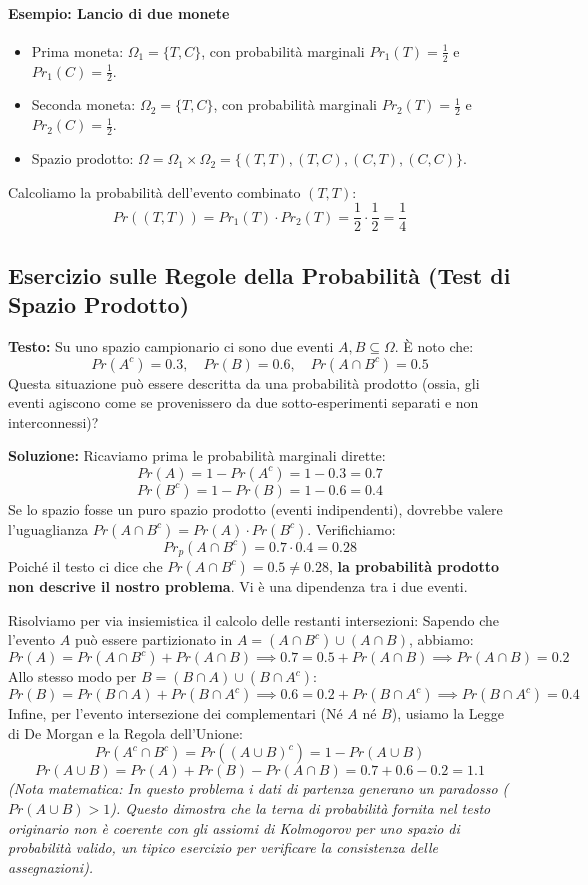 \documentclass[12pt, a4paper]{article}
\begin{document}
\paragraph{Esempio: Lancio di due monete}
\begin{itemize}
    \item Prima moneta: $\Omega_1 = \{T, C\}$, con probabilità marginali $Pr_1(T) = \frac{1}{2}$ e $Pr_1(C) = \frac{1}{2}$.
    \item Seconda moneta: $\Omega_2 = \{T, C\}$, con probabilità marginali $Pr_2(T) = \frac{1}{2}$ e $Pr_2(C) = \frac{1}{2}$.
    \item Spazio prodotto: $\Omega = \Omega_1 \times \Omega_2 = \{(T,T), (T,C), (C,T), (C,C)\}$.
\end{itemize}
Calcoliamo la probabilità dell'evento combinato $(T,T)$:
$$ Pr((T,T)) = Pr_1(T) \cdot Pr_2(T) = \frac{1}{2} \cdot \frac{1}{2} = \frac{1}{4} $$

\subsection{Esercizio sulle Regole della Probabilità (Test di Spazio Prodotto)}
\textbf{Testo:} Su uno spazio campionario ci sono due eventi $A, B \subseteq \Omega$. È noto che:
$$ Pr(A^c) = 0.3, \quad Pr(B) = 0.6, \quad Pr(A \cap B^c) = 0.5 $$
Questa situazione può essere descritta da una probabilità prodotto (ossia, gli eventi agiscono come se provenissero da due sotto-esperimenti separati e non interconnessi)?

\textbf{Soluzione:}
Ricaviamo prima le probabilità marginali dirette:
$$ Pr(A) = 1 - Pr(A^c) = 1 - 0.3 = 0.7 $$
$$ Pr(B^c) = 1 - Pr(B) = 1 - 0.6 = 0.4 $$
Se lo spazio fosse un puro spazio prodotto (eventi indipendenti), dovrebbe valere l'uguaglianza $Pr(A \cap B^c) = Pr(A) \cdot Pr(B^c)$. Verifichiamo:
$$ Pr_p(A \cap B^c) = 0.7 \cdot 0.4 = 0.28 $$
Poiché il testo ci dice che $Pr(A \cap B^c) = 0.5 \neq 0.28$, \textbf{la probabilità prodotto non descrive il nostro problema}. Vi è una dipendenza tra i due eventi.

Risolviamo per via insiemistica il calcolo delle restanti intersezioni:
Sapendo che l'evento $A$ può essere partizionato in $A = (A \cap B^c) \cup (A \cap B)$, abbiamo:
$$ Pr(A) = Pr(A \cap B^c) + Pr(A \cap B) \implies 0.7 = 0.5 + Pr(A \cap B) \implies Pr(A \cap B) = 0.2 $$
Allo stesso modo per $B = (B \cap A) \cup (B \cap A^c)$:
$$ Pr(B) = Pr(B \cap A) + Pr(B \cap A^c) \implies 0.6 = 0.2 + Pr(B \cap A^c) \implies Pr(B \cap A^c) = 0.4 $$
Infine, per l'evento intersezione dei complementari (Né $A$ né $B$), usiamo la Legge di De Morgan e la Regola dell'Unione:
$$ Pr(A^c \cap B^c) = Pr((A \cup B)^c) = 1 - Pr(A \cup B) $$
$$ Pr(A \cup B) = Pr(A) + Pr(B) - Pr(A \cap B) = 0.7 + 0.6 - 0.2 = 1.1 $$
\textit{(Nota matematica: In questo problema i dati di partenza generano un paradosso ($Pr(A \cup B) > 1$). Questo dimostra che la terna di probabilità fornita nel testo originario non è coerente con gli assiomi di Kolmogorov per uno spazio di probabilità valido, un tipico esercizio per verificare la consistenza delle assegnazioni).}
\end{document}
